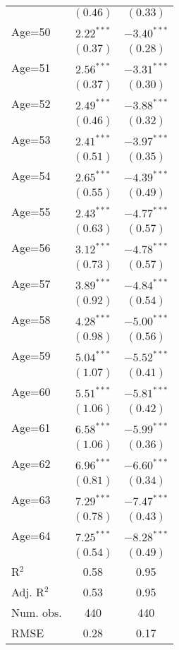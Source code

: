 \documentclass[fullpage]{paper}
\begin{document}
\begin{center}
\begin{longtable}{l c c }
            & $(0.46)$      & $(0.33)$      \\
Age=50      & $2.22^{***}$  & $-3.40^{***}$ \\
            & $(0.37)$      & $(0.28)$      \\
Age=51      & $2.56^{***}$  & $-3.31^{***}$ \\
            & $(0.37)$      & $(0.30)$      \\
Age=52      & $2.49^{***}$  & $-3.88^{***}$ \\
            & $(0.46)$      & $(0.32)$      \\
Age=53      & $2.41^{***}$  & $-3.97^{***}$ \\
            & $(0.51)$      & $(0.35)$      \\
Age=54      & $2.65^{***}$  & $-4.39^{***}$ \\
            & $(0.55)$      & $(0.49)$      \\
Age=55      & $2.43^{***}$  & $-4.77^{***}$ \\
            & $(0.63)$      & $(0.57)$      \\
Age=56      & $3.12^{***}$  & $-4.78^{***}$ \\
            & $(0.73)$      & $(0.57)$      \\
Age=57      & $3.89^{***}$  & $-4.84^{***}$ \\
            & $(0.92)$      & $(0.54)$      \\
Age=58      & $4.28^{***}$  & $-5.00^{***}$ \\
            & $(0.98)$      & $(0.56)$      \\
Age=59      & $5.04^{***}$  & $-5.52^{***}$ \\
            & $(1.07)$      & $(0.41)$      \\
Age=60      & $5.51^{***}$  & $-5.81^{***}$ \\
            & $(1.06)$      & $(0.42)$      \\
Age=61      & $6.58^{***}$  & $-5.99^{***}$ \\
            & $(1.06)$      & $(0.36)$      \\
Age=62      & $6.96^{***}$  & $-6.60^{***}$ \\
            & $(0.81)$      & $(0.34)$      \\
Age=63      & $7.29^{***}$  & $-7.47^{***}$ \\
            & $(0.78)$      & $(0.43)$      \\
Age=64      & $7.25^{***}$  & $-8.28^{***}$ \\
            & $(0.54)$      & $(0.49)$      \\
\hline
R$^2$       & 0.58          & 0.95          \\
Adj. R$^2$  & 0.53          & 0.95          \\
Num. obs.   & 440           & 440           \\
RMSE        & 0.28          & 0.17          \\
\end{longtable}
\end{center}
\end{document}
